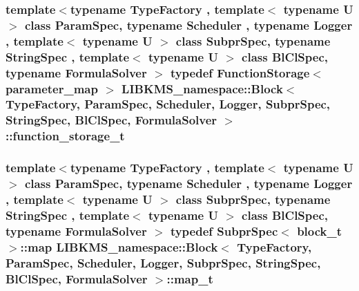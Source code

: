 \hypertarget{classLIBKMS__namespace_1_1Block_a2776c98e95ec6726f062516f0a0cf496}{
\subsubsection[{function\-\_\-storage\-\_\-t}]{\setlength{\rightskip}{0pt plus 5cm}template$<$typename Type\-Factory , template$<$ typename U $>$ class Param\-Spec, typename Scheduler , typename Logger , template$<$ typename U $>$ class Subpr\-Spec, typename String\-Spec , template$<$ typename U $>$ class Bl\-Cl\-Spec, typename Formula\-Solver $>$ typedef {\bf Function\-Storage}$<$ {\bf parameter\-\_\-map} $>$ {\bf L\-I\-B\-K\-M\-S\-\_\-namespace\-::\-Block}$<$ {\bf Type\-Factory}, Param\-Spec, Scheduler, Logger, Subpr\-Spec, String\-Spec, Bl\-Cl\-Spec, Formula\-Solver $>$\-::{\bf function\-\_\-storage\-\_\-t}}}\label{classLIBKMS__namespace_1_1Block_a2776c98e95ec6726f062516f0a0cf496}
\hypertarget{classLIBKMS__namespace_1_1Block_aedba90f9127d999f41d7d397e691e081}{
\subsubsection[{map\-\_\-t}]{\setlength{\rightskip}{0pt plus 5cm}template$<$typename Type\-Factory , template$<$ typename U $>$ class Param\-Spec, typename Scheduler , typename Logger , template$<$ typename U $>$ class Subpr\-Spec, typename String\-Spec , template$<$ typename U $>$ class Bl\-Cl\-Spec, typename Formula\-Solver $>$ typedef Subpr\-Spec$<$ {\bf block\-\_\-t} $>$\-::map {\bf L\-I\-B\-K\-M\-S\-\_\-namespace\-::\-Block}$<$ {\bf Type\-Factory}, Param\-Spec, Scheduler, Logger, Subpr\-Spec, String\-Spec, Bl\-Cl\-Spec, Formula\-Solver $>$\-::{\bf map\-\_\-t}}}\label{classLIBKMS__namespace_1_1Block_aedba90f9127d999f41d7d397e691e081}
